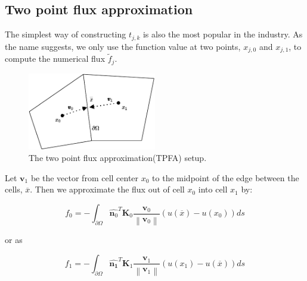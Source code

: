 \documentclass[../Main/main.tex]{subfiles}
\begin{document}
	\subsection*{Two point flux approximation}
	The simplest way of constructing $t_{j,k}$ is also the most popular in the industry. As the name suggests, we only use the function value at two points, $x_{j,0}$ and $x_{j,1}$, to compute the numerical flux $\tilde{f}_j$.
	\begin{figure}[H]
		\centering
		\includegraphics[width=0.5\textwidth]{two point.pdf}
		\caption{The two point flux approximation(TPFA) setup.}
		\label{fig:tpfa control volume}
	\end{figure}
	Let $\bm{v}_1$ be the vector from cell center $x_0$ to the midpoint of the edge between the cells, $\overline{x}$. Then we approximate the flux out of cell $x_0$ into cell $x_1$ by:
	
	\begin{equation}\label{eq:f_0}
		f_0=-\int_{\partial \Omega} \hat{\bm{n}_0}^T \bm{K}_0  \frac{\bm{v}_0}{\left \| \bm{v}_0 \right \|} (u(\overline{x})-u(x_0))ds
	\end{equation}
	
	or as
	
	\begin{equation}\label{eq:f_1}
		f_1 = -\int_{\partial \Omega} \hat{\bm{n_1}}^T \bm{K}_1  \frac{\bm{v}_1}{\left \| \bm{v}_1 \right \|} (u(x_1)-u(\overline{x}))ds
	\end{equation}	
	
\end{document}
